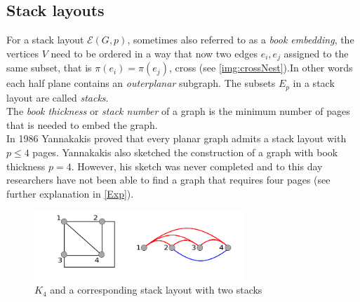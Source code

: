 \subsection{Stack layouts}
For a stack layout $\mathcal{E}(G,p)$, sometimes also referred to as a \textit{book embedding}, the vertices $V$ need to be ordered in a way that now two edges $e_i, e_j$ assigned to the same subset, that is $\pi(e_i) = \pi(e_j)$, cross (see \autoref{img:crossNest}).In other words each half plane contains an \textit{outerplanar} subgraph. The subsets $E_p$ in a stack layout are called \textit{stacks}.\\
The \textit{book thickness} or \textit{stack number} of a graph is the minimum number of pages that is needed to embed the graph.\\
In 1986 Yannakakis \cite{yannakakis1986four} proved that every planar graph admits  a stack layout with $p \leq 4$ pages. Yannakakis also sketched the construction of a graph with book thickness $p = 4$. However, his sketch was never completed and to this day researchers have not been able to find a graph that requires four pages (see further explanation in \autoref{Exp}).
\begin{figure}[!h]
\begin{center}
\includegraphics[width=0.7\textwidth]{figures/K4Stack.png}
\caption{$K_4$ and a corresponding stack layout with two stacks}
\label{img:stackGHG}
\end{center}
\end{figure}
